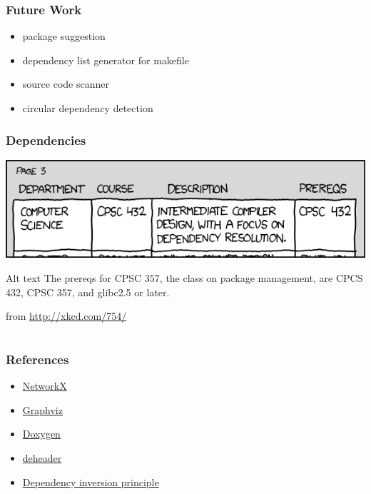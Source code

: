 \begin{frame}[t]
	\frametitle{Future Work}
	\begin{itemize}
		\item<+-|alert@+> package suggestion
		\item<+-|alert@+> dependency list generator for makefile
		\item<+-|alert@+> source code scanner
		\item<+-|alert@+> circular dependency detection
	\end{itemize}
\end{frame}

\begin{frame}
	\frametitle{Dependencies}
	\begin{center}
		\includegraphics[scale=0.7]{xkcd754-dependencies.png}
		\begin{block}{Alt text}
		The prereqs for CPSC 357, the class on package management, are CPCS 432, CPSC 357, and glibc2.5 or later.
		\end{block}
		from \url{http://xkcd.com/754/}
	\end{center}
\end{frame}


\section*{}
\begin{frame}[t]
	\frametitle{References}
	\begin{itemize}
		\item \href{http://networkx.lanl.gov/}{NetworkX}
		\item \href{http://www.graphviz.org/}{Graphviz}
		\item \href{http://www.doxygen.org/}{Doxygen}
		\item \href{http://www.catb.org/~esr/deheaderv/}{deheader}
		\item \href{http://www.objectmentor.com/resources/articles/dip.pdf}{Dependency inversion principle}
	\end{itemize}
\end{frame}


